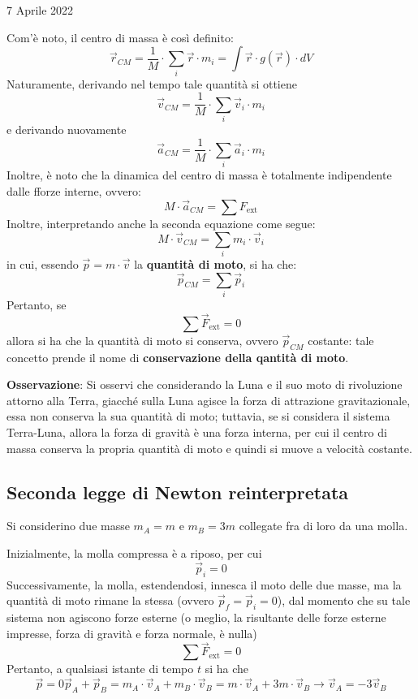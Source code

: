 \documentclass[a4paper]{extarticle}
\begin{document}
\newpage
\noindent
\begin{center}
  7 Aprile 2022
\end{center}
Com'è noto, il centro di massa è così definito:
\[\vec r_{CM} = \frac{1}{M} \cdot \sum_i \vec r \cdot m_i = \int \vec r \cdot g(\vec r) \cdot dV\]
Naturamente, derivando nel tempo tale quantità si ottiene
\[\vec v_{CM} = \frac{1}{M} \cdot \sum_i \vec v_i \cdot m_i\]
e derivando nuovamente
\[\vec a_{CM} = \frac{1}{M} \cdot \sum_i \vec a_i \cdot m_i\]
Inoltre, è noto che la dinamica del centro di massa è totalmente indipendente dalle fforze interne, ovvero:
\[M \cdot \vec a_{CM} = \sum F_{\text{ext}}\]
Inoltre, interpretando anche la seconda equazione come segue:
\[M \cdot \vec v_{CM} = \sum_i m_i \cdot \vec v_i\]
in cui, essendo $\vec p = m \cdot \vec v$ la \textbf{quantità di moto}, si ha che:
\[\vec p_{CM} = \sum_i \vec p_i\]
Pertanto, se
\[\sum \vec F_{\text{ext}} = 0\]
allora si ha che la quantità di moto si conserva, ovvero $\vec p_{CM}$ costante: tale concetto prende il nome di \textbf{conservazione della qantità di moto}.

\vspace{1em}
\noindent
\textbf{Osservazione}: Si osservi che considerando la Luna e il suo moto di rivoluzione attorno alla Terra, giacché sulla Luna agisce la forza di attrazione gravitazionale, essa non conserva la sua quantità di moto; tuttavia, se si considera il sistema Terra-Luna, allora la forza di gravità è una forza interna, per cui il centro di massa conserva la propria quantità di moto e quindi si muove a velocità costante.

\vspace{1em}
\subsection{Seconda legge di Newton reinterpretata}
Si considerino due masse $m_A=m$ e $m_B=3m$ collegate fra di loro da una molla.


\vspace{1em}
\noindent
Inizialmente, la molla compressa è a riposo, per cui
\[\vec p_i=0\]
Successivamente, la molla, estendendosi, innesca il moto delle due masse, ma la quantità di moto rimane la stessa (ovvero $\vec p_f=\vec p_i=0$), dal momento che su tale sistema non agiscono forze esterne (o meglio, la risultante delle forze esterne impresse, forza di gravità e forza normale, è nulla)
\[\sum \vec F_{\text{ext}} = 0\]
Pertanto, a qualsiasi istante di tempo $t$ si ha che
\[\vec p = 0 \vec p_A + \vec p_B = m_A \cdot \vec v_A + m_B \cdot \vec v_B = m \cdot \vec v_A + 3m \cdot \vec v_B \longrightarrow \vec v_A =-3 \vec v_B\]
\end{document}
